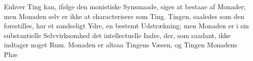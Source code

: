 \documentclass[12pt]{book}
\newcommand{\opage}[1]{\marginnote{\footnotesize\textit{[#1]}}}
\begin{document}
Enhver Ting kan, ifølge den monistiske Synsmaade, siges at bestaae af Monader; men
Monaden selv er ikke at characterisere som Ting. Tingen, saaledes som den forestilles,
har et sandseligt Ydre, en bestemt Udstrækning; men Monaden er i sin substantielle
Selvvirksomhed det intellectuelle Indre, der, som saadant, ikke indtager noget Rum.
Monaden er altsaa Tingens Væsen, og Tingen Monadens Phæ%
\opage{169}%
%
%
%
%
\end{document}
